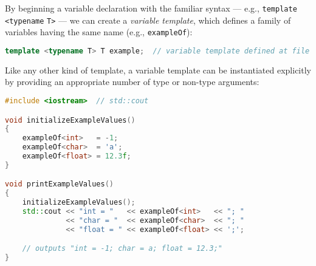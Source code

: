 %
%
%

By beginning a variable declaration with the familiar  syntax --- e.g., \lstinline!template! \lstinline!<typename! \lstinline!T>! --- we can create a \emph{variable template}, which defines a family of variables
having the same name (e.g., \lstinline!exampleOf!):

\begin{lstlisting}[language=C++]
template <typename T> T example;  // variable template defined at file scope
\end{lstlisting}

\noindent Like any other kind of template, a variable template can be instantiated explicitly by
providing an appropriate number of type or non-type arguments:

\begin{lstlisting}[language=C++]
#include <iostream>  // std::cout

void initializeExampleValues()
{
    exampleOf<int>   = -1;
    exampleOf<char>  = 'a';
    exampleOf<float> = 12.3f;
}

void printExampleValues()
{
    initializeExampleValues();
    std::cout << "int = "   << exampleOf<int>   << "; "
              << "char = "  << exampleOf<char>  << "; "
              << "float = " << exampleOf<float> << ';';

    // outputs "int = -1; char = a; float = 12.3;"
}
\end{lstlisting}

